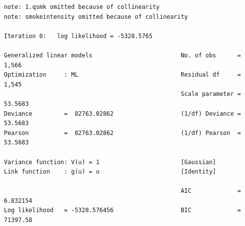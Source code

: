 \documentclass[
  10pt,
]{book}
\begin{document}
\begin{verbatim}
note: 1.qsmk omitted because of collinearity
note: smokeintensity omitted because of collinearity

Iteration 0:   log likelihood = -5328.5765  

Generalized linear models                         No. of obs      =      1,566
Optimization     : ML                             Residual df     =      1,545
                                                  Scale parameter =    53.5683
Deviance         =  82763.02862                   (1/df) Deviance =    53.5683
Pearson          =  82763.02862                   (1/df) Pearson  =    53.5683

Variance function: V(u) = 1                       [Gaussian]
Link function    : g(u) = u                       [Identity]

                                                  AIC             =   6.832154
Log likelihood   = -5328.576456                   BIC             =   71397.58


\end{verbatim}
\end{document}
